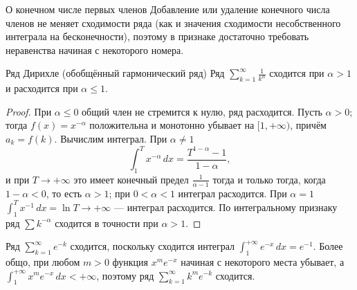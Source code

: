 \begin{Remark}{О конечном числе первых членов}{}
	Добавление или удаление конечного числа членов не меняет сходимости ряда
	(как и значения сходимости несобственного интеграла на бесконечности),
	поэтому в признаке достаточно требовать неравенства начиная с некоторого
	номера.
\end{Remark}

\begin{Corollary}{Ряд Дирихле (обобщённый гармонический ряд)}{}
	Ряд $\displaystyle\sum_{k=1}^{\infty}\frac{1}{k^{\alpha}}$ сходится при
	$\alpha>1$ и расходится при $\alpha\le1$.
\end{Corollary}

\begin{proof}
	При $\alpha\le0$ общий член не стремится к нулю, ряд расходится. Пусть
	$\alpha>0$; тогда $f(x)=x^{-\alpha}$ положительна и монотонно убывает на
	$[1,+\infty)$, причём $a_k=f(k)$. Вычислим интеграл. При $\alpha\ne1$
	\[
	\int_{1}^{T} x^{-\alpha}\,dx
	=\frac{T^{1-\alpha}-1}{1-\alpha},
	\]
	и при $T\to+\infty$ это имеет конечный предел $\frac{1}{\alpha-1}$ тогда и
	только тогда, когда $1-\alpha<0$, то есть $\alpha>1$; при $0<\alpha<1$
	интеграл расходится. При $\alpha=1$
	$\int_1^T x^{-1}\,dx=\ln T\to+\infty$ --- интеграл расходится. По
	интегральному признаку ряд $\sum k^{-\alpha}$ сходится в точности при
	$\alpha>1$.
\end{proof}

\begin{Example}{}{}
	Ряд $\sum_{k=1}^{\infty} e^{-k}$ сходится, поскольку сходится интеграл
	$\int_1^{+\infty} e^{-x}\,dx=e^{-1}$. Более общо, при любом $m>0$ функция
	$x^m e^{-x}$ начиная с некоторого места убывает, а
	$\int_1^{+\infty} x^m e^{-x}\,dx<+\infty$, поэтому ряд
	$\sum_{k=1}^{\infty} k^m e^{-k}$ сходится.
\end{Example}
